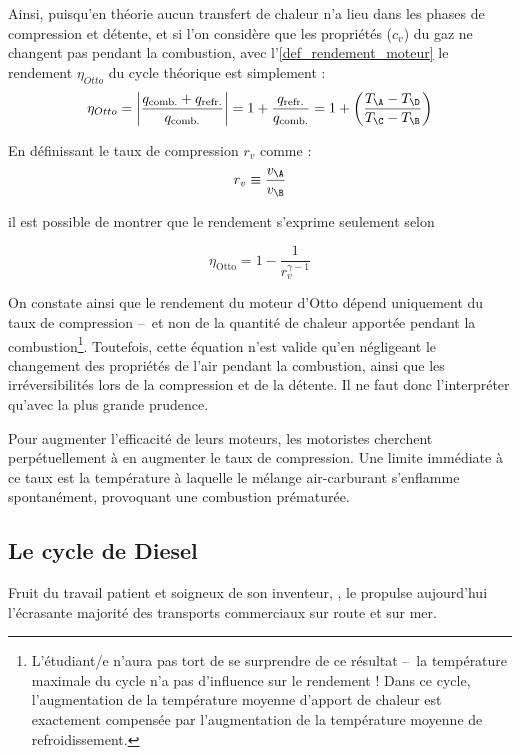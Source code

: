 		Ainsi, puisqu’en théorie aucun transfert de chaleur n’a lieu dans les phases de compression et détente, et si l’on considère que les propriétés ($c_v$) du gaz ne changent pas pendant la combustion, avec l’\cref{def_rendement_moteur} le rendement $\eta_{Otto}$ du cycle théorique est simplement :
		\begin{equation*}
			\eta_{Otto} = \left| \frac{q_\text{comb.} + q_\text{refr.}}{q_\text{comb.}} \right| = 1 + \frac{q_\text{refr.}}{q_\text{comb.}} = 1 + \left( \frac{T_\A - T_\D}{T_\C - T_\B } \right)
		\end{equation*}

		En définissant le taux de compression $r_v$ comme :
		\begin{equation}
			r_v \equiv  \frac{v_\A}{v_\B }
		\end{equation}

		il est possible de montrer que le rendement s’exprime seulement selon

		\begin{equation}
			\eta_\text{Otto} = 1 - \frac{1}{r_v^{\gamma -1}}
		\end{equation}

		On constate ainsi que le rendement du moteur d’Otto dépend uniquement du taux de compression --\ et non de la quantité de chaleur apportée pendant la combustion\footnote{L’étudiant/e n’aura pas tort de se surprendre de ce résultat --\ la température maximale du cycle n’a pas d’influence sur le rendement ! Dans ce cycle, l’augmentation de la température moyenne d’apport de chaleur est exactement compensée par l’augmentation de la température moyenne de refroidissement.}\nolinebreak.
		Toutefois, cette équation n’est valide qu’en négligeant le changement des propriétés de l’air pendant la combustion, ainsi que les irréversibilités lors de la compression et de la détente. Il ne faut donc l’interpréter qu’avec la plus grande prudence.

		Pour augmenter l’efficacité de leurs moteurs, les motoristes cherchent perpétuellement à en augmenter le taux de compression. Une limite immédiate à ce taux est la température à laquelle le mélange air-carburant s’enflamme spontanément, provoquant une combustion prématurée.



	\subsection{Le cycle de Diesel}

		Fruit du travail patient et soigneux de son inventeur, , le  propulse aujourd’hui l’écrasante majorité des transports commerciaux sur route et sur mer.

